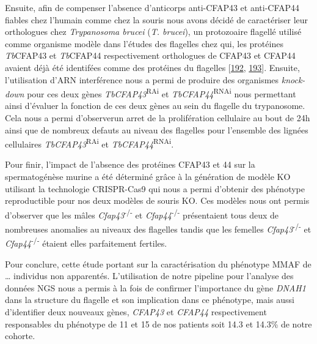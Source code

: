 \documentclass[12pt,twoside]{reedthesis}
\theoremstyle{definition}
\theoremstyle{definition}
\theoremstyle{remark}
\begin{document}
  Ensuite, afin de compenser l'absence d'anticorps anti-CFAP43 et
  anti-CFAP44 fiables chez l'humain comme chez la souris nous avons décidé
  de caractériser leur orthologues chez \emph{Trypanosoma brucei}
  (\emph{T. brucei}), un protozoaire flagellé utilisé comme organisme
  modèle dans l'études des flagelles chez qui, les protéines
  \emph{Tb}CFAP43 et \emph{Tb}CFAP44 respectivement orthologues de CFAP43
  et CFAP44 avaient déjà été identifées comme des protéines du flagelles
  {[}\protect\hyperlink{ref-Broadhead2006}{192},
  \protect\hyperlink{ref-Subota2014}{193}{]}. Ensuite, l'utilisation d'ARN
  interférence nous a permi de produire des organismes \emph{knock-down}
  pour ces deux gènes \emph{TbCFAP43}\textsuperscript{RAi} et
  \emph{TbCFAP44}\textsuperscript{RNAi} nous permettant ainsi d'évaluer la
  fonction de ces deux gènes au sein du flagelle du trypanosome. Cela nous
  a permi d'observerun arret de la prolifération cellulaire au bout de 24h
  ainsi que de nombreux defauts au niveau des flagelles pour l'ensemble
  des lignées cellulaires \emph{TbCFAP43}\textsuperscript{RAi} et
  \emph{TbCFAP44}\textsuperscript{RNAi}.
  
  Pour finir, l'impact de l'absence des protéines CFAP43 et 44 sur la
  spermatogénèse murine a été déterminé grâce à la génération de modèle KO
  utilisant la technologie CRISPR-Cas9 qui nous a permi d'obtenir des
  phénotype reproductible pour nos deux modèles de souris KO. Ces modèles
  nous ont permis d'observer que les mâles
  \emph{Cfap43}\textsuperscript{-/-} et \emph{Cfap44}\textsuperscript{-/-}
  présentaient tous deux de nombreuses anomalies au niveaux des flagelles
  tandis que les femelles \emph{Cfap43}\textsuperscript{-/-} et
  \emph{Cfap44}\textsuperscript{-/-} étaient elles parfaitement fertiles.
  
  Pour conclure, cette étude portant sur la caractérisation du phénotype
  MMAF de \ldots{} individus non apparentés. L'utilisation de notre
  pipeline pour l'analyse des données NGS nous a permis à la fois de
  confirmer l'importance du gène \emph{DNAH1} dans la structure du
  flagelle et son implication dans ce phénotype, mais aussi d'identifier
  deux nouveaux gènes, \emph{CFAP43} et \emph{CFAP44} respectivement
  responsables du phénotype de 11 et 15 de nos patients soit 14.3 et
  14.3\% de notre cohorte.
  
  \newpage
  
\end{document}
